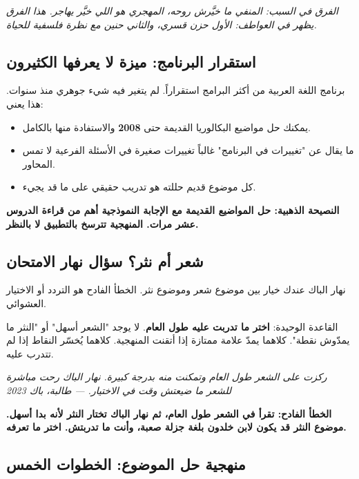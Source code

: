 \documentclass[12pt,a4paper]{book}
\newcommand{\quoteAr}[1]{%
	\begin{myquote}
		\itshape #1
	\end{myquote}
}
\newcommand{\importantAr}[1]{%
	\begin{important}
		\bfseries #1
	\end{important}
}
\begin{document}
	\quoteAr{الفرق في السبب: المنفي ما خيَّرش روحه، المهجري هو اللي خيَّر يهاجر. هذا الفرق يظهر في العواطف: الأول حزن قسري، والثاني حنين مع نظرة فلسفية للحياة.}
	
	\subsection{استقرار البرنامج: ميزة لا يعرفها الكثيرون}
	
	برنامج اللغة العربية من أكثر البرامج استقراراً. لم يتغير فيه شيء جوهري منذ سنوات. هذا يعني:
	
	\begin{itemize}
		\item يمكنك حل مواضيع البكالوريا القديمة حتى \textbf{2008} والاستفادة منها بالكامل.
		\item ما يقال عن "تغييرات في البرنامج" غالباً تغييرات صغيرة في الأسئلة الفرعية لا تمس المحاور.
		\item كل موضوع قديم حللته هو تدريب حقيقي على ما قد يجيء.
	\end{itemize}
	
	\importantAr{النصيحة الذهبية: حل المواضيع القديمة مع الإجابة النموذجية أهم من قراءة الدروس عشر مرات. المنهجية تترسخ بالتطبيق لا بالنظر.}
	
	\subsection{شعر أم نثر؟ سؤال نهار الامتحان}
	
	نهار الباك عندك خيار بين موضوع شعر وموضوع نثر. الخطأ الفادح هو التردد أو الاختيار العشوائي.
	
	القاعدة الوحيدة: \textbf{اختر ما تدربت عليه طول العام}. لا يوجد "الشعر أسهل" أو "النثر ما يمدّوش نقطة". كلاهما يمدّ علامة ممتازة إذا أتقنت المنهجية. كلاهما يُخسّر النقاط إذا لم تتدرب عليه.
	
	\quoteAr{ركزت على الشعر طول العام وتمكنت منه بدرجة كبيرة. نهار الباك رحت مباشرة للشعر ما ضيعتش وقت في الاختيار. — طالبة، باك 2023}
	
	\importantAr{الخطأ الفادح: تقرأ في الشعر طول العام، ثم نهار الباك تختار النثر لأنه بدا أسهل. موضوع النثر قد يكون لابن خلدون بلغة جزلة صعبة، وأنت ما تدربتش. اختر ما تعرفه.}
	
	\subsection{منهجية حل الموضوع: الخطوات الخمس}
	
\end{document}
